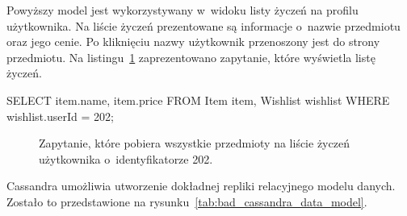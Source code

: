 Powyższy model jest wykorzystywany w~widoku listy życzeń na profilu użytkownika. Na liście życzeń prezentowane są informacje o~nazwie przedmiotu oraz jego cenie. Po kliknięciu nazwy użytkownik przenoszony jest do strony przedmiotu. Na listingu~\ref{lst:sql_wishlist} zaprezentowano zapytanie, które wyświetla listę życzeń.

\begin{verbbox}[\footnotesize]
	SELECT item.name, item.price
	FROM Item item, Wishlist wishlist
	WHERE wishlist.userId = 202;
\end{verbbox}

\begin{figure}[ht!]
	\centering
	\theverbbox

	\caption{Zapytanie, które pobiera wszystkie przedmioty na liście życzeń użytkownika o~identyfikatorze 202.}
	\label{lst:sql_wishlist}
\end{figure}

Cassandra umożliwia utworzenie dokładnej repliki relacyjnego modelu danych. Zostało to przedstawione na rysunku~\ref{tab:bad_cassandra_data_model}.

